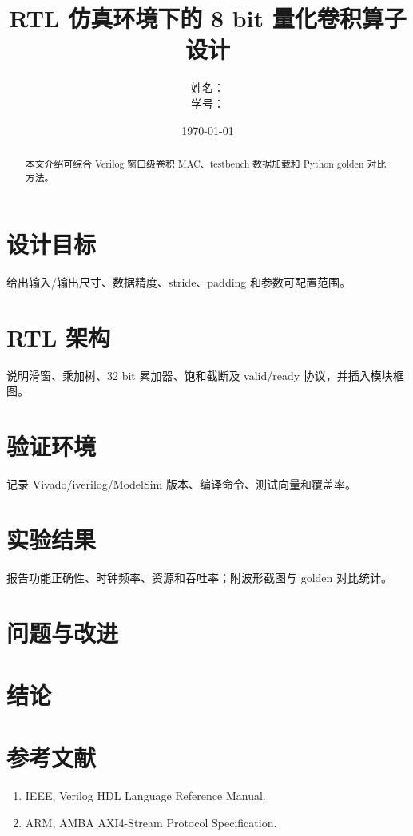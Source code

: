 \documentclass[UTF8,a4paper,12pt]{ctexart}
\title{RTL 仿真环境下的 8 bit 量化卷积算子设计}
\author{姓名：\underline{\hspace{4cm}}\\学号：\underline{\hspace{4cm}}}\date{\today}
\begin{document}
\maketitle
\begin{abstract}本文介绍可综合 Verilog 窗口级卷积 MAC、testbench 数据加载和 Python golden 对比方法。\end{abstract}
\section{设计目标}给出输入/输出尺寸、数据精度、stride、padding 和参数可配置范围。
\section{RTL 架构}说明滑窗、乘加树、32 bit 累加器、饱和截断及 valid/ready 协议，并插入模块框图。
\section{验证环境}记录 Vivado/iverilog/ModelSim 版本、编译命令、测试向量和覆盖率。
\section{实验结果}报告功能正确性、时钟频率、资源和吞吐率；附波形截图与 golden 对比统计。
\section{问题与改进}\section{结论}\section*{参考文献}\begin{enumerate}\item IEEE, Verilog HDL Language Reference Manual.\item ARM, AMBA AXI4-Stream Protocol Specification.\end{enumerate}
\end{document}
